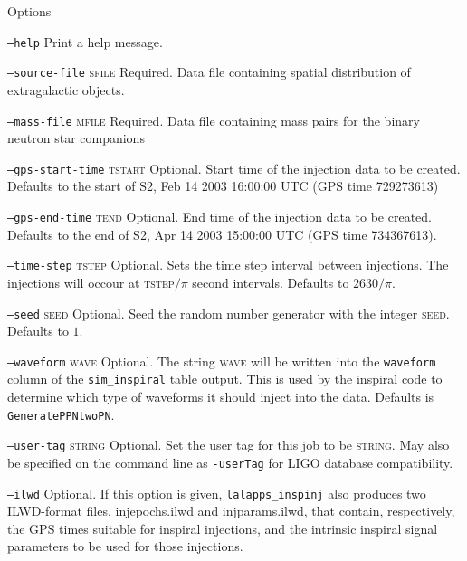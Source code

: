 \begin{entry}
\item[Options]\leavevmode
\begin{entry}
\item[\texttt{--help}] Print a help message.

\item[\texttt{--source-file} \textsc{sfile}]
Required. Data file containing spatial  distribution of extragalactic objects.

\item[\texttt{--mass-file} \textsc{mfile}]
Required. Data file containing mass pairs for the binary neutron star
companions

\item[\texttt{--gps-start-time} \textsc{tstart}]
Optional.  Start time of the injection data to be created. Defaults to the
start of S2, Feb 14 2003 16:00:00 UTC (GPS time 729273613)

\item[\texttt{--gps-end-time} \textsc{tend}]
Optional. End time of the injection data to be created. Defaults to the end of
S2, Apr 14 2003 15:00:00 UTC (GPS time 734367613).

\item[\texttt{--time-step} \textsc{tstep}]
Optional. Sets the time step interval between injections. The injections will
occour at \textsc{tstep}$/\pi$ second intervals. Defaults to $2630/\pi$.

\item[\texttt{--seed} \textsc{seed}]
Optional. Seed the random number generator with the integer \textsc{seed}.
Defaults to $1$.

\item[\texttt{--waveform} \textsc{wave}]
Optional. The string \textsc{wave} will be written into the \texttt{waveform}
column of the \texttt{sim\_inspiral} table output. This is used by the
inspiral code to determine which type of waveforms it should inject into the
data. Defaults is \texttt{GeneratePPNtwoPN}.

\item[\texttt{--user-tag} \textsc{string}] Optional. Set the user tag for this
job to be \textsc{string}. May also be specified on the command line as 
\texttt{-userTag} for LIGO database compatibility.

\item[\texttt{--ilwd}] Optional. If this option is given,
\verb+lalapps_inspinj+ also produces two ILWD-format files, injepochs.ilwd and
injparams.ilwd, that contain, respectively, the  GPS  times  suitable for
inspiral injections, and the intrinsic inspiral signal parameters to be used
for  those injections.


\end{entry}
\end{entry}
